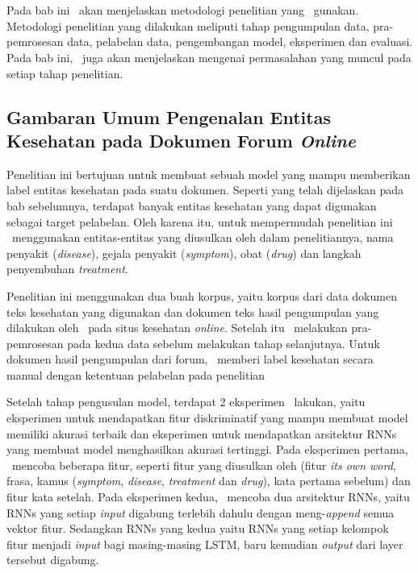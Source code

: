 \chapter{\babTiga}
Pada bab ini \saya~akan menjelaskan metodologi penelitian yang \saya~gunakan. Metodologi penelitian yang dilakukan meliputi tahap pengumpulan data, pra-pemrosesan data, pelabelan data, pengembangan model, eksperimen dan evaluasi. Pada bab ini, \saya~juga akan menjelaskan mengenai permasalahan yang muncul pada setiap tahap penelitian.

\section{Gambaran Umum Pengenalan Entitas Kesehatan pada Dokumen Forum \textit{Online}}
Penelitian ini bertujuan untuk membuat sebuah model yang mampu memberikan label entitas kesehatan pada suatu dokumen. Seperti yang telah dijelaskan pada bab sebelumnya, terdapat banyak entitas kesehatan yang dapat digunakan sebagai target pelabelan. Oleh karena itu, untuk mempermudah penelitian ini \saya~menggunakan entitas-entitas yang diusulkan oleh \cite{skripsiKakRadit} dalam penelitiannya,  nama penyakit (\textit{disease}), gejala penyakit (\textit{symptom}), obat (\textit{drug}) dan langkah penyembuhan \textit{treatment}.

Penelitian ini menggunakan dua buah korpus, yaitu korpus dari data dokumen teks kesehatan yang digunakan \cite{skripsiKakRadit} dan dokumen teks hasil pengumpulan yang dilakukan oleh \saya~pada situs kesehatan \textit{online}. Setelah itu \saya~melakukan pra-pemrosesan pada kedua data sebelum melakukan tahap selanjutnya. Untuk dokumen hasil pengumpulan dari forum, \saya~memberi label kesehatan secara manual dengan ketentuan pelabelan pada penelitian \cite{skripsiKakRadit}

Setelah tahap pengusulan model, terdapat 2 eksperimen \saya~lakukan, yaitu eksperimen untuk mendapatkan fitur diskriminatif yang mampu membuat model memiliki akurasi terbaik dan eksperimen untuk mendapatkan arsitektur RNNs yang membuat model menghasilkan akurasi tertinggi. Pada eksperimen pertama, \saya~mencoba beberapa fitur, seperti fitur yang diusulkan oleh \cite{skripsiKakRadit} (fitur \textit{its own word}, frasa, kamus (\textit{symptom}, \textit{disease}, \textit{treatment} dan \textit{drug}), kata pertama sebelum) dan fitur kata setelah. Pada eksperimen kedua, \saya~mencoba dua arsitektur RNNs, yaitu RNNs yang setiap \textit{input} digabung terlebih dahulu dengan meng-\textit{append} semua vektor fitur. Sedangkan RNNs yang kedua yaitu RNNs yang setiap kelompok fitur menjadi \textit{input} bagi masing-masing LSTM, baru kemudian \textit{output} dari layer tersebut digabung.

